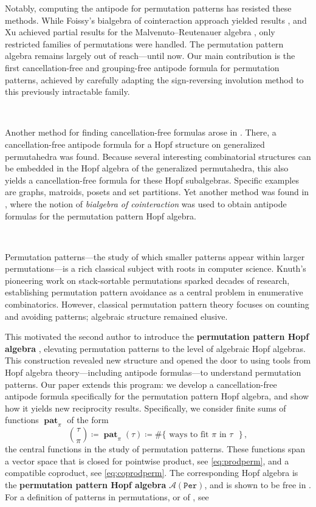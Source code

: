 \documentclass[12pt, reqno]{amsart}
\theoremstyle{definition}
\DeclareMathOperator{\pat}{\mathbf{pat}}
\begin{document}
Notably, computing the antipode for permutation patterns has resisted these methods.
While Foissy's bialgebra of cointeraction approach yielded results \cite{Foissy}, and Xu achieved partial results for the Malvenuto–Reutenauer algebra \cite{xu2022cancellation}, only restricted families of permutations were handled.
The permutation pattern algebra remains largely out of reach---until now.
Our main contribution is the first cancellation-free and grouping-free antipode formula for permutation patterns, achieved by carefully adapting the sign-reversing involution method to this previously intractable family.

\

Another method for finding cancellation-free formulas arose in \cite{aguiar2017hopf}.
There, a cancellation-free antipode formula for a Hopf structure on generalized permutahedra was found. 
Because several interesting combinatorial structures can be embedded in the Hopf algebra of the generalized permutahedra, this also yields a cancellation-free formula for these Hopf subalgebras.
Specific examples are graphs, matroids, posets and set partitions.
Yet another method was found in \cite{Foissy}, where the notion of \emph{bialgebra of cointeraction} was used to obtain antipode formulas for the permutation pattern Hopf algebra.

\

Permutation patterns---the study of which smaller patterns appear within larger permutations---is a rich classical subject with roots in computer science.
Knuth's pioneering work on stack-sortable permutations \cite{Knuth} sparked decades of research, establishing permutation pattern avoidance as a central problem in enumerative combinatorics.
However, classical permutation pattern theory focuses on counting and avoiding patterns; algebraic structure remained elusive.

This motivated the second author to introduce the \textbf{permutation pattern Hopf algebra} \cite{Vargas}, elevating permutation patterns to the level of algebraic Hopf algebras.
This construction revealed new structure and opened the door to using tools from Hopf algebra theory---including antipode formulas---to understand permutation patterns.
Our paper extends this program: we develop a cancellation-free antipode formula specifically for the permutation pattern Hopf algebra, and show how it yields new reciprocity results.
Specifically, we consider finite sums of functions $\pat_{\pi}$ of the form 
$$ \binom{\tau}{\pi} \coloneqq \pat_{\pi}(\tau)\coloneqq  \#\{\text{ ways to fit $\pi$ in $\tau$ }\}\, ,$$
the central functions in the study of permutation patterns.
These functions span a vector space that is closed for pointwise product, see \eqref{eq:prodperm}, and a compatible coproduct, see \eqref{eq:coprodperm}.
The corresponding Hopf algebra is the \textbf{permutation pattern Hopf algebra} $\mathcal{A}(\mathtt{Per})$, and is shown to be free in \cite{Vargas}.
For a definition of patterns in permutations, or of , see \cite{penaguiao2020algebraic}
\end{document}
